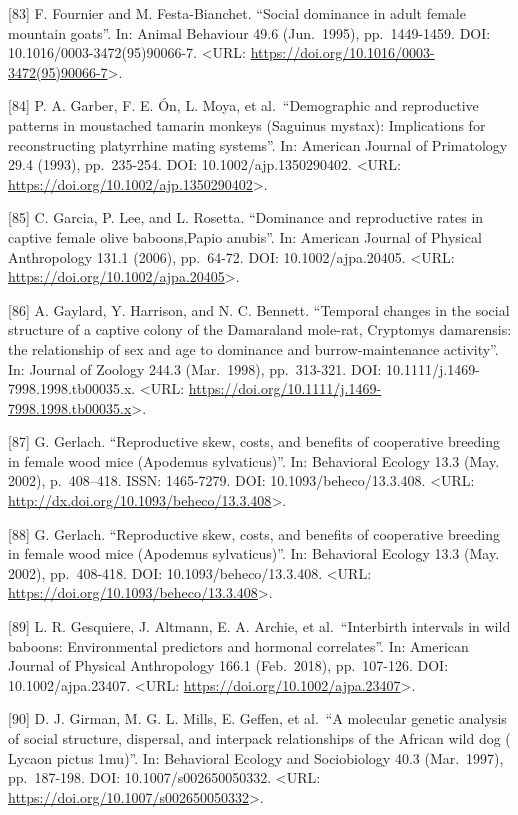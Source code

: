 \documentclass[
]{article}
\begin{document}
{[}83{]} F. Fournier and M. Festa-Bianchet. ``Social dominance in adult
female mountain goats''. In: Animal Behaviour 49.6 (Jun.~1995),
pp.~1449-1459. DOI: 10.1016/0003-3472(95)90066-7. \textless URL:
\url{https://doi.org/10.1016/0003-3472(95)90066-7}\textgreater.

{[}84{]} P. A. Garber, F. E. Ón, L. Moya, et al.~``Demographic and
reproductive patterns in moustached tamarin monkeys (Saguinus mystax):
Implications for reconstructing platyrrhine mating systems''. In:
American Journal of Primatology 29.4 (1993), pp.~235-254. DOI:
10.1002/ajp.1350290402. \textless URL:
\url{https://doi.org/10.1002/ajp.1350290402}\textgreater.

{[}85{]} C. Garcia, P. Lee, and L. Rosetta. ``Dominance and reproductive
rates in captive female olive baboons,Papio anubis''. In: American
Journal of Physical Anthropology 131.1 (2006), pp.~64-72. DOI:
10.1002/ajpa.20405. \textless URL:
\url{https://doi.org/10.1002/ajpa.20405}\textgreater.

{[}86{]} A. Gaylard, Y. Harrison, and N. C. Bennett. ``Temporal changes
in the social structure of a captive colony of the Damaraland mole-rat,
Cryptomys damarensis: the relationship of sex and age to dominance and
burrow-maintenance activity''. In: Journal of Zoology 244.3 (Mar.~1998),
pp.~313-321. DOI: 10.1111/j.1469-7998.1998.tb00035.x. \textless URL:
\url{https://doi.org/10.1111/j.1469-7998.1998.tb00035.x}\textgreater.

{[}87{]} G. Gerlach. ``Reproductive skew, costs, and benefits of
cooperative breeding in female wood mice (Apodemus sylvaticus)''. In:
Behavioral Ecology 13.3 (May. 2002), p.~408--418. ISSN: 1465-7279. DOI:
10.1093/beheco/13.3.408. \textless URL:
\url{http://dx.doi.org/10.1093/beheco/13.3.408}\textgreater.

{[}88{]} G. Gerlach. ``Reproductive skew, costs, and benefits of
cooperative breeding in female wood mice (Apodemus sylvaticus)''. In:
Behavioral Ecology 13.3 (May. 2002), pp.~408-418. DOI:
10.1093/beheco/13.3.408. \textless URL:
\url{https://doi.org/10.1093/beheco/13.3.408}\textgreater.

{[}89{]} L. R. Gesquiere, J. Altmann, E. A. Archie, et al.~``Interbirth
intervals in wild baboons: Environmental predictors and hormonal
correlates''. In: American Journal of Physical Anthropology 166.1
(Feb.~2018), pp.~107-126. DOI: 10.1002/ajpa.23407. \textless URL:
\url{https://doi.org/10.1002/ajpa.23407}\textgreater.

{[}90{]} D. J. Girman, M. G. L. Mills, E. Geffen, et al.~``A molecular
genetic analysis of social structure, dispersal, and interpack
relationships of the African wild dog ( Lycaon pictus 1mu)''. In:
Behavioral Ecology and Sociobiology 40.3 (Mar.~1997), pp.~187-198. DOI:
10.1007/s002650050332. \textless URL:
\url{https://doi.org/10.1007/s002650050332}\textgreater.
\end{document}
